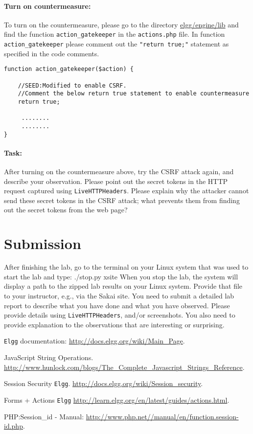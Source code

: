 \paragraph{Turn on countermeasure:}


To turn on the countermeasure, please go to the directory
\url{elgg/engine/lib} and 
find the function {\tt action\_gatekeeper} in the {\tt actions.php} file. 
In function {\tt action\_gatekeeper} please comment out the 
{\tt "return true;"} statement as specified in the code comments.

{\footnotesize
\begin{Verbatim}[frame=single]
function action_gatekeeper($action) {

	//SEED:Modified to enable CSRF. 
	//Comment the below return true statement to enable countermeasure
	return true;

	 ........
	 ........
}
\end{Verbatim}
}

\paragraph{Task:}
After turning on the countermeasure above, try the CSRF attack again, 
and describe your observation. Please point out the secret tokens in the 
HTTP request captured using {\tt LiveHTTPHeaders}. Please explain why
the attacker cannot send these secret tokens in the CSRF attack; what
prevents them from finding out the secret tokens from the web page?   


\section{Submission}
After finishing the lab, go to the terminal on your Linux system that was used to start the lab and type:
./stop.py xsite
When you stop the lab, the system will display a path to the zipped lab results on your Linux system.  Provide that file to
your instructor, e.g., via the Sakai site.
You need to submit a detailed lab report to describe what you have
done and what you have observed. Please provide details using
{\tt LiveHTTPHeaders},  and/or screenshots.
You also need to provide explanation
to the observations that are interesting or surprising.


\begin{thebibliography}{10}


{\tt Elgg} documentation:
\newblock \url{http://docs.elgg.org/wiki/Main_Page}.

JavaScript String Operations.
\newblock \url{http://www.hunlock.com/blogs/The_Complete_Javascript_Strings_Reference}.	 

Session Security {\tt Elgg}.
\newblock \url{http://docs.elgg.org/wiki/Session_security}.

Forms + Actions {\tt Elgg}
\newblock \url{http://learn.elgg.org/en/latest/guides/actions.html}.

PHP:Session\_id - Manual:
\newblock \url{http://www.php.net//manual/en/function.session-id.php}.


\end{thebibliography}


